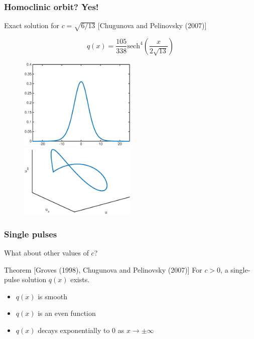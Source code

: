 \documentclass[16pt]{beamer}
\begin{document}
\begin{frame}
	\frametitle{Homoclinic orbit? Yes!}
	\fontsize{16}{7.2}\selectfont
	Exact solution for $c = \sqrt{6/13}$ \footnotesize [Chugunova and Pelinovsky (2007)]
	\begin{center}
	\[
	q(x) = \frac{105}{338}\text{sech}^4\left( \frac{x}{2\sqrt{13}}\right) 
	\]
	\end{center}
	\begin{figure}
   		\includegraphics[width=0.5\textwidth]{images/exactsol}
   		\hfill
   		\includegraphics[width=0.5\textwidth]{images/exactsolorbit}
	\end{figure}
\end{frame}

\begin{frame}
	\frametitle{Single pulses}
	\fontsize{16}{7.2}\selectfont
	What about other values of $c$?

	\vspace{1cm}

	\begin{block}{Theorem \footnotesize [Groves (1998), Chugunova and Pelinovsky (2007)]}
	For $c>0$, a single-pulse solution $q(x)$ exists.
	\begin{itemize}
		\item $q(x)$ is smooth
		\item $q(x)$ is an even function
		\item $q(x)$ decays exponentially to 0 as $x \rightarrow \pm \infty$
	\end{itemize}
	\end{block}
\end{frame}
\end{document}

